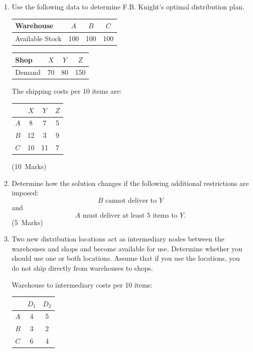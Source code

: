 \documentclass[11pt,a4paper]{article}
\newcommand{\markalloc}[1]{\nobreak\hfill\mbox{(#1 Marks)}}
\begin{document}
\begin{enumerate}
\item Use the following data to determine F.B. Knight's optimal distribution plan.

\begin{center}
\begin{tabular}{lccc}
\toprule
Warehouse & $A$ & $B$ & $C$ \\
\midrule
Available Stock & 100 & 100 & 100 \\
\bottomrule
\end{tabular}
\end{center}

\begin{center}
\begin{tabular}{lccc}
\toprule
Shop & $X$ & $Y$ & $Z$ \\
\midrule
Demand & 70 & 80 & 150 \\
\bottomrule
\end{tabular}
\end{center}

The shipping costs per 10 items are:

\begin{center}
\begin{tabular}{lccc}
\toprule
 & $X$ & $Y$ & $Z$ \\
\midrule
$A$ & 8 & 7 & 5 \\
$B$ & 12 & 3 & 9 \\
$C$ & 10 & 11 & 7 \\
\bottomrule
\end{tabular}
\end{center}

\markalloc{10}

\item Determine how the solution changes if the following additional restrictions are imposed:
\[
B \text{ cannot deliver to } Y
\]
and
\[
A \text{ must deliver at least 5 items to } Y.
\]
\markalloc{5}

\item Two new distribution locations act as intermediary nodes between the warehouses and shops and become available for use.
Determine whether you should use one or both locations.
Assume that if you use the locations, you do not ship directly from warehouses to shops.

Warehouse to intermediary costs per 10 items:

\begin{center}
\begin{tabular}{lcc}
\toprule
 & $D_1$ & $D_2$ \\
\midrule
$A$ & 4 & 5 \\
$B$ & 3 & 2 \\
$C$ & 6 & 4 \\
\bottomrule
\end{tabular}
\end{center}


\end{enumerate}
\end{document}
